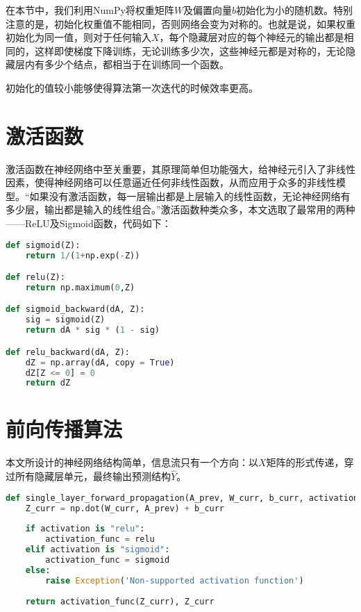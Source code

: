 在本节中，我们利用NumPy将权重矩阵$W$及偏置向量$b$初始化为小的随机数。特别注意的是，初始化权重值不能相同，否则网络会变为对称的。也就是说，如果权重初始化为同一值，则对于任何输入$X$，每个隐藏层对应的每个神经元的输出都是相同的，这样即使梯度下降训练，无论训练多少次，这些神经元都是对称的，无论隐藏层内有多少个结点，都相当于在训练同一个函数。

初始化的值较小能够使得算法第一次迭代的时候效率更高。

\section{激活函数}

激活函数在神经网络中至关重要，其原理简单但功能强大，给神经元引入了非线性因素，使得神经网络可以任意逼近任何非线性函数，从而应用于众多的非线性模型。“如果没有激活函数，每一层输出都是上层输入的线性函数，无论神经网络有多少层，输出都是输入的线性组合。”激活函数种类众多，本文选取了最常用的两种——ReLU及Sigmoid函数，代码如下：

\begin{lstlisting}[language=python, breaklines]
def sigmoid(Z):
    return 1/(1+np.exp(-Z))

def relu(Z):
    return np.maximum(0,Z)

def sigmoid_backward(dA, Z):
    sig = sigmoid(Z)
    return dA * sig * (1 - sig)

def relu_backward(dA, Z):
    dZ = np.array(dA, copy = True)
    dZ[Z <= 0] = 0
    return dZ
\end{lstlisting}

\section{前向传播算法}

本文所设计的神经网络结构简单，信息流只有一个方向：以$X$矩阵的形式传递，穿过所有隐藏层单元，最终输出预测结构$\hat{Y}$。

\begin{lstlisting}[language=python, breaklines]
def single_layer_forward_propagation(A_prev, W_curr, b_curr, activation="relu"):
    Z_curr = np.dot(W_curr, A_prev) + b_curr
    
    if activation is "relu":
        activation_func = relu
    elif activation is "sigmoid":
        activation_func = sigmoid
    else:
        raise Exception('Non-supported activation function')
        
    return activation_func(Z_curr), Z_curr
\end{lstlisting}

